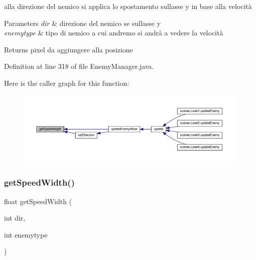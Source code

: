 alla direzione del nemico si applica lo spostamento sull\textquotesingle{}asse y in base alla velocità 


\begin{DoxyParams}{Parameters}
{\em dir} & direzione del nemico se sull\textquotesingle{}asse y \\
\hline
{\em enemytype} & tipo di nemico a cui andremo si andrà a vedere la velocità\\
\hline
\end{DoxyParams}
\begin{DoxyReturn}{Returns}
pixel da aggiungere alla posizione 
\end{DoxyReturn}


Definition at line 318 of file Enemy\+Manager.\+java.

Here is the caller graph for this function\+:
\nopagebreak
\begin{figure}[H]
\begin{center}
\leavevmode
\includegraphics[width=350pt]{classmanagers_1_1_enemy_manager_a263c83da9aebeac50b60770fb847f331_icgraph}
\end{center}
\end{figure}
\mbox{\label{classmanagers_1_1_enemy_manager_ae622455c9dd19d2583b9a8840b1b35de}} 
\subsubsection{\texorpdfstring{get\+Speed\+Width()}{getSpeedWidth()}}
{\footnotesize\ttfamily float get\+Speed\+Width (\begin{DoxyParamCaption}\item[{int}]{dir,  }\item[{int}]{enemytype }\end{DoxyParamCaption})}



